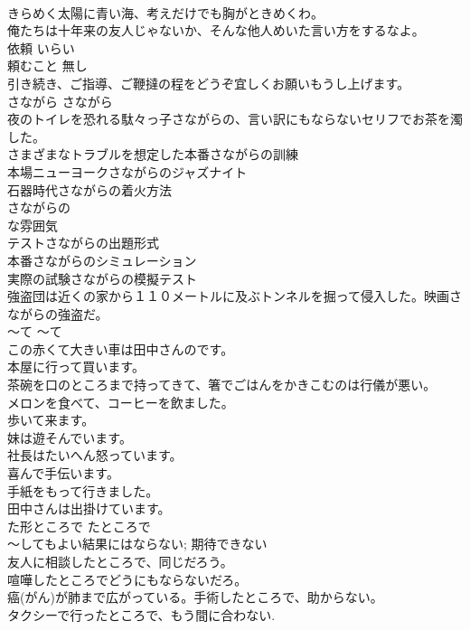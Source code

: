 \documentclass[8pt]{extreport}
\begin{document}
\begin{CJK}{UTF8}{min}
\\	きらめく太陽に青い海、考えだけでも胸がときめくわ。  
\\	俺たちは十年来の友人じゃないか、そんな他人めいた言い方をするなよ。  
\\	依頼	いらい	
\\	頼むこと	無し	
\\	引き続き、ご指導、ご鞭撻の程をどうぞ宜しくお願いもうし上げます。  
\\	さながら	さながら	
\\	夜のトイレを恐れる駄々っ子さながらの、言い訳にもならないセリフでお茶を濁した。  
\\	さまざまなトラブルを想定した本番さながらの訓練  
\\	本場ニューヨークさながらのジャズナイト  
\\	石器時代さながらの着火方法  
\\	さながらの
\\	な雰囲気   
\\	テストさながらの出題形式   
\\	本番さながらのシミュレーション   
\\	実際の試験さながらの模擬テスト   
\\	強盗団は近くの家から１１０メートルに及ぶトンネルを掘って侵入した。映画さながらの強盗だ。  
\\	〜て	〜て	
\\	この赤くて大きい車は田中さんのです。 
\\	本屋に行って買います。
\\	茶碗を口のところまで持ってきて、箸でごはんをかきこむのは行儀が悪い。  
\\	メロンを食べて、コーヒーを飲ました。
\\	歩いて来ます。
\\	妹は遊そんでいます。
\\	社長はたいへん怒っています。
\\	喜んで手伝います。
\\	手紙をもって行きました。
\\	田中さんは出掛けています。
\\	た形ところで	たところで	
\\	〜してもよい結果にはならない; 期待できない	
\\	友人に相談したところで、同じだろう。  
\\	喧嘩したところでどうにもならないだろ。  
\\	癌(がん)が肺まで広がっている。手術したところで、助からない。  
\\	タクシーで行ったところで、もう間に合わない.  

\end{CJK}
\end{document}
